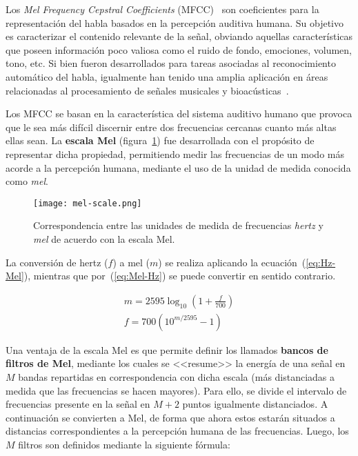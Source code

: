 Los \textit{Mel Frequency Cepstral Coefficients} (MFCC)~\cite{Davis80} son coeficientes para la representación del habla basados en la percepción auditiva humana.
Su objetivo es caracterizar el contenido relevante de la señal, obviando aquellas características que poseen información poco valiosa como el ruido de fondo, emociones, volumen, tono, etc.
Si bien fueron desarrollados para tareas asociadas al reconocimiento automático del habla, igualmente han tenido una amplia aplicación en áreas relacionadas al procesamiento de señales musicales y bioacústicas~\cite{Clemins05,Cowling03,Dufour14,Fagerlund07,Lee06,Li01,McKinney03,Mitrovic06}.

Los MFCC se basan en la característica del sistema auditivo humano que provoca que le sea más difícil discernir entre dos frecuencias cercanas cuanto más altas ellas sean.
La \textbf{escala Mel} (figura~\ref{img:mel-scale}) fue desarrollada con el propósito de representar dicha propiedad, permitiendo medir las frecuencias de un modo más acorde a la percepción humana, mediante el uso de la unidad de medida conocida como \textit{mel}.

\begin{figure}[!h]
    \centering
    \texttt{[image: mel-scale.png]}
    \caption{Correspondencia entre las unidades de medida de frecuencias \textit{hertz} y \textit{mel} de acuerdo con la escala Mel.}
    \label{img:mel-scale}
\end{figure}

La conversión de hertz ($f$) a mel ($m$) se realiza aplicando la ecuación~(\ref{eq:Hz-Mel}), mientras que por~(\ref{eq:Mel-Hz}) se puede convertir en sentido contrario.

\begin{gather}
    \label{eq:Hz-Mel}
    m = 2595\log_{10}\left( 1 + \frac{f}{700} \right) \\
    \label{eq:Mel-Hz}
    f = 700\left( 10^{m/2595} - 1 \right)
\end{gather}

Una ventaja de la escala Mel es que permite definir los llamados \textbf{bancos de filtros de Mel}, mediante los cuales se <<resume>> la energía de una señal en $M$ bandas repartidas en correspondencia con dicha escala (más distanciadas a medida que las frecuencias se hacen mayores).
Para ello, se divide el intervalo de frecuencias presente en la señal en $M+2$ puntos igualmente distanciados.
A continuación se convierten a Mel, de forma que ahora estos estarán situados a distancias correspondientes a la percepción humana de las frecuencias.
Luego, los $M$ filtros son definidos mediante la siguiente fórmula:

